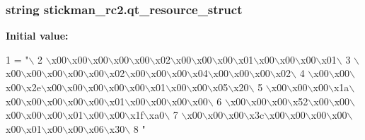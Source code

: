 \hypertarget{namespacestickman__rc2_a28835346450059026f3b52c3b96aab18}{}
\subsubsection[{qt\+\_\+resource\+\_\+struct}]{\setlength{\rightskip}{0pt plus 5cm}string stickman\+\_\+rc2.\+qt\+\_\+resource\+\_\+struct}\label{namespacestickman__rc2_a28835346450059026f3b52c3b96aab18}
{\bfseries Initial value\+:}
\begin{DoxyCode}
1 = \textcolor{stringliteral}{"\(\backslash\)}
2 \textcolor{stringliteral}{\(\backslash\)x00\(\backslash\)x00\(\backslash\)x00\(\backslash\)x00\(\backslash\)x00\(\backslash\)x02\(\backslash\)x00\(\backslash\)x00\(\backslash\)x00\(\backslash\)x01\(\backslash\)x00\(\backslash\)x00\(\backslash\)x00\(\backslash\)x01\(\backslash\)}
3 \textcolor{stringliteral}{\(\backslash\)x00\(\backslash\)x00\(\backslash\)x00\(\backslash\)x00\(\backslash\)x00\(\backslash\)x02\(\backslash\)x00\(\backslash\)x00\(\backslash\)x00\(\backslash\)x04\(\backslash\)x00\(\backslash\)x00\(\backslash\)x00\(\backslash\)x02\(\backslash\)}
4 \textcolor{stringliteral}{\(\backslash\)x00\(\backslash\)x00\(\backslash\)x00\(\backslash\)x2e\(\backslash\)x00\(\backslash\)x00\(\backslash\)x00\(\backslash\)x00\(\backslash\)x00\(\backslash\)x01\(\backslash\)x00\(\backslash\)x00\(\backslash\)x05\(\backslash\)x20\(\backslash\)}
5 \textcolor{stringliteral}{\(\backslash\)x00\(\backslash\)x00\(\backslash\)x00\(\backslash\)x1a\(\backslash\)x00\(\backslash\)x00\(\backslash\)x00\(\backslash\)x00\(\backslash\)x00\(\backslash\)x01\(\backslash\)x00\(\backslash\)x00\(\backslash\)x00\(\backslash\)x00\(\backslash\)}
6 \textcolor{stringliteral}{\(\backslash\)x00\(\backslash\)x00\(\backslash\)x00\(\backslash\)x52\(\backslash\)x00\(\backslash\)x00\(\backslash\)x00\(\backslash\)x00\(\backslash\)x00\(\backslash\)x01\(\backslash\)x00\(\backslash\)x00\(\backslash\)x1f\(\backslash\)xa0\(\backslash\)}
7 \textcolor{stringliteral}{\(\backslash\)x00\(\backslash\)x00\(\backslash\)x00\(\backslash\)x3c\(\backslash\)x00\(\backslash\)x00\(\backslash\)x00\(\backslash\)x00\(\backslash\)x00\(\backslash\)x01\(\backslash\)x00\(\backslash\)x00\(\backslash\)x06\(\backslash\)x30\(\backslash\)}
8 \textcolor{stringliteral}{"}
\end{DoxyCode}
